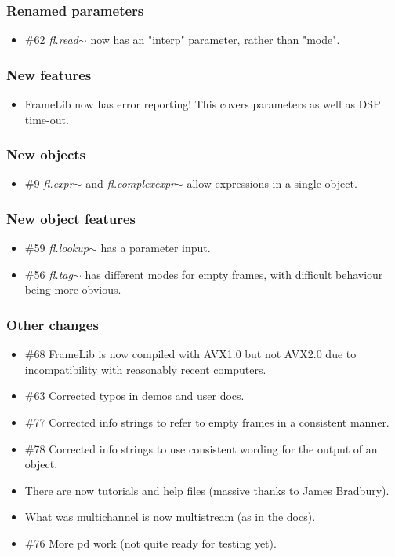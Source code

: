 \documentclass{article}
\newcommand{\flobject}[1]{\textit{fl.#1$\sim$}}
\begin{document}
\subsubsection{Renamed parameters}

\begin{itemize}
\item {\#62} \flobject{read} now has an "interp" parameter, rather than "mode".
\end{itemize}

\subsubsection{New features}

\begin{itemize}
\item FrameLib now has error reporting! This covers parameters as well as DSP time-out.
\end{itemize}

\subsubsection{New objects}

\begin{itemize}
\item {\#9} \flobject{expr} and \flobject{complexexpr} allow expressions in a single object.
\end{itemize}

\subsubsection{New object features}

\begin{itemize}
\item {\#59} \flobject{lookup} has a parameter input.
\item {\#56} \flobject{tag} has different modes for empty frames, with difficult behaviour being more obvious.
\end{itemize}

\subsubsection{Other changes}

\begin{itemize}
\item {\#68} FrameLib is now compiled with AVX1.0 but not AVX2.0 due to incompatibility with reasonably recent computers.
\item {\#63} Corrected typos in demos and user docs.
\item {\#77} Corrected info strings to refer to empty frames in a consistent manner.
\item {\#78} Corrected info strings to use consistent wording for the output of an object.
\item There are now tutorials and help files (massive thanks to James Bradbury).
\item What was multichannel is now multistream (as in the docs).
\item {\#76} More pd work (not quite ready for testing yet).
\end{itemize}
\end{document}
